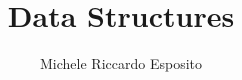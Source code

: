 \documentclass[a4paper]{report}
\begin{document}
\title{Data Structures}
\author{Michele Riccardo Esposito}
\maketitle

\setcounter{page}{2}
\tableofcontents

\end{document}
